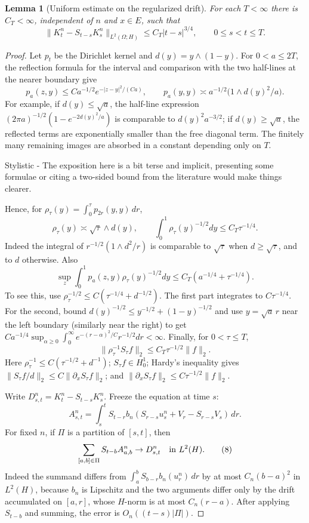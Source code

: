 \documentclass[12pt]{article}
\newtheorem{lemma}{Lemma}
\newcommand{\1}{\mathbf 1}
\newcommand{\review}[1]{\begin{reviewbox}#1\end{reviewbox}}
\begin{document}
\begin{lemma}[Uniform estimate on the regularized drift]\label{lem:Hestimate}
For each \(T<\infty\) there is \(C_T<\infty\), independent of \(n\) and
\(x\in E\), such that
\[
 \|K_t^n-S_{t-s}K_s^n\|_{L^2(\Omega;H)}
      \le C_T |t-s|^{3/4},\qquad 0\le s<t\le T .             \tag{2}
\]
\end{lemma}

\begin{proof}
Let \(p_t\) be the Dirichlet kernel and \(d(y)=y\wedge(1-y)\).  For
\(0<a\le 2T\), the reflection formula for the interval and comparison with
the two half-lines at the nearer boundary give
\[
p_a(z,y)\le Ca^{-1/2}e^{-|z-y|^2/(Ca)},\qquad
p_a(y,y)\asymp a^{-1/2}\bigl(1\wedge d(y)^2/a\bigr).          \tag{3}
\]
For example, if \(d(y)\le\sqrt a\), the half-line expression
\((2\pi a)^{-1/2}(1-e^{-2d(y)^2/a})\) is comparable to \(d(y)^2a^{-3/2}\);
if \(d(y)\ge\sqrt a\), the reflected terms are exponentially smaller than
the free diagonal term.  The finitely many remaining images are absorbed in a
constant depending only on \(T\). 
\review{Stylistic - The exposition here is a bit terse and implicit, presenting some formulae or citing a two-sided bound from the literature would make things clearer.}
Hence, for
\(\rho_\tau(y)=\int_0^\tau p_{2r}(y,y)\,dr\),
\[
        \rho_\tau(y)\asymp \sqrt{\tau}\wedge d(y),\qquad
        \int_0^1\rho_\tau(y)^{-1/2}dy\le C_T\tau^{-1/4}.      \tag{4}
\]
Indeed the integral of \(r^{-1/2}(1\wedge d^2/r)\) is comparable to
\(\sqrt\tau\) when \(d\ge\sqrt\tau\), and to \(d\) otherwise.  Also
\[
 \sup_z\int_0^1p_a(z,y)\rho_\tau(y)^{-1/2}dy
 \le C_T(a^{-1/4}+\tau^{-1/4}).                              \tag{5}
\]
To see this, use \(\rho_\tau^{-1/2}\le C(\tau^{-1/4}+d^{-1/2})\).  The first
part integrates to \(C\tau^{-1/4}\).  For the second, bound
\(d(y)^{-1/2}\le y^{-1/2}+(1-y)^{-1/2}\) and use
\(y=\sqrt a\,r\) near the left boundary (similarly near the right) to get
\(Ca^{-1/4}\sup_{\alpha\ge0}\int_0^\infty
e^{-(r-\alpha)^2/C}r^{-1/2}dr<\infty\).  Finally, for \(0<\tau\le T\),
\[
        \|\rho_\tau^{-1}S_\tau f\|_2\le C_T\tau^{-1/2}\|f\|_2. \tag{6}
\]
Here \(\rho_\tau^{-1}\le C(\tau^{-1/2}+d^{-1})\); \(S_\tau f\in H^1_0\);
Hardy's inequality gives \(\|S_\tau f/d\|_2\le C\|\partial_xS_\tau f\|_2\);
and \(\|\partial_xS_\tau f\|_2\le C\tau^{-1/2}\|f\|_2\).

Write \(D^n_{s,t}=K_t^n-S_{t-s}K_s^n\).  Freeze the equation at time \(s\):
\[
 A^n_{s,t}=\int_s^tS_{t-r}
 b_n\!\left(S_{r-s}u_s^n+V_r-S_{r-s}V_s\right)\,dr .          \tag{7}
\]
For fixed \(n\), if \(\Pi\) is a partition of \([s,t]\), then
\[
 \sum_{[a,b]\in\Pi}S_{t-b}A^n_{a,b}\to D^n_{s,t}\quad\hbox{in }L^2(H).
 \tag{8}
\]
Indeed the summand differs from
\(\int_a^bS_{b-r}b_n(u_r^n)\,dr\) by at most
\(C_n(b-a)^2\) in \(L^2(H)\), because \(b_n\) is Lipschitz and the two
arguments differ only by the drift accumulated on \([a,r]\), whose \(H\)-norm
is at most \(C_n(r-a)\).  After applying \(S_{t-b}\) and summing, the error is
\(O_n((t-s)|\Pi|)\).


\end{proof}
\end{document}
